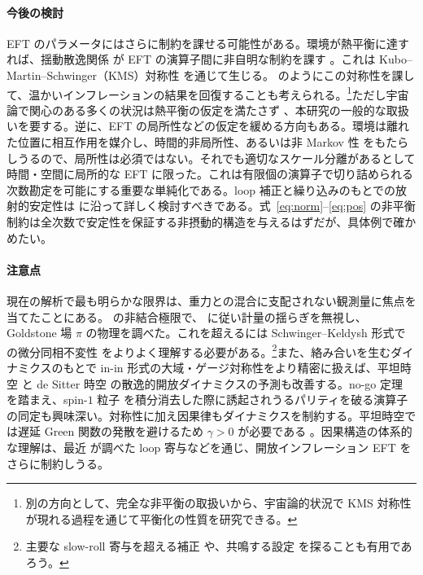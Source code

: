 \documentclass[a4paper,11pt]{ltjsarticle}
\numberwithin{equation}{section}
\newcommand{\Eqs}[1]{Eqs.~(\ref{#1})}
\renewcommand{\Eqs}[1]{式~\eqref{#1}}
\begin{document}
\paragraph{今後の検討} EFT のパラメータにはさらに制約を課せる可能性がある。環境が熱平衡に達すれば、揺動散逸関係 \cite{Kubo:1966fyg} が EFT の演算子間に非自明な制約を課す \cite{Hongo:2018ant, Ota:2024mps}。これは Kubo--Martin--Schwinger（KMS）対称性 \cite{Crossley:2015evo, Glorioso:2016gsa, Glorioso:2017fpd} を通じて生じる。\cite{Ota:2024mps} のようにこの対称性を課して、温かいインフレーションの結果を回復することも考えられる。\footnote{別の方向として、完全な非平衡の取扱いから、宇宙論的状況で KMS 対称性が現れる過程を通じて平衡化の性質を研究できる。}ただし宇宙論で関心のある多くの状況は熱平衡の仮定を満たさず \cite{Colas:2022hlq}、本研究の一般的な取扱いを要する。逆に、EFT の局所性などの仮定を緩める方向もある。環境は離れた位置に相互作用を媒介し、時間的非局所性、あるいは非 Markov 性 \cite{Colas:2022kfu} をもたらしうるので、局所性は必須ではない。それでも適切なスケール分離があるとして時間・空間に局所的な EFT に限った。これは有限個の演算子で切り詰められる次数勘定を可能にする重要な単純化である。loop 補正と繰り込みのもとでの放射的安定性は \cite{Adshead:2017srh,Grall:2020tqc} に沿って詳しく検討すべきである。\Eqs{eq:norm}--\eqref{eq:pos} の非平衡制約は全次数で安定性を保証する非摂動的構造を与えるはずだが、具体例で確かめたい。

\paragraph{注意点} 現在の解析で最も明らかな限界は、重力との混合に支配されない観測量に焦点を当てたことにある。\cite{Cheung:2007st} の非結合極限で、\cite{LopezNacir:2011kk} に従い計量の揺らぎを無視し、Goldstone 場 $\pi$ の物理を調べた。これを超えるには Schwinger--Keldysh 形式での微分同相不変性 \cite{Akyuz:2023lsm} をよりよく理解する必要がある。\footnote{主要な slow-roll 寄与を超える補正 \cite{Green:2024hbw} や、共鳴する設定 \cite{Flauger:2009ab,Flauger:2010ja,Behbahani:2011it,DuasoPueyo:2023kyh} を探ることも有用であろう。}また、絡み合いを生むダイナミクスのもとで in-in 形式の大域・ゲージ対称性をより精密に扱えば、平坦時空 \cite{Matsumura:2023cni, Kashiwagi:2023zwj} と de Sitter 時空 \cite{Lotkov:2023vqt} の散逸的開放ダイナミクスの予測も改善する。no-go 定理 \cite{Liu:2019fag,Cabass:2022rhr} を踏まえ、spin-$1$ 粒子 \cite{Anber:2009ua, Peloso:2022ovc} を積分消去した際に誘起されうるパリティを破る演算子の同定も興味深い。対称性に加え因果律もダイナミクスを制約する。平坦時空では遅延 Green 関数の発散を避けるため $\gamma>0$ が必要である \cite{kamenev_2011}。因果構造の体系的な理解は、最近 \cite{Agui-Salcedo:2023wlq} が調べた loop 寄与などを通じ、開放インフレーション EFT をさらに制約しうる。
\end{document}
